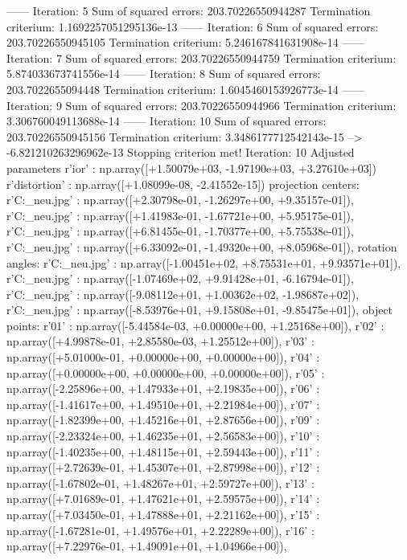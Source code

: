 ------ Iteration: 5
Sum of squared errors: 203.70226550944287
Termination criterium: 1.1692257051295136e-13
------ Iteration: 6
Sum of squared errors: 203.70226550945105
Termination criterium: 5.246167841631908e-14
------ Iteration: 7
Sum of squared errors: 203.70226550944759
Termination criterium: 5.874033673741556e-14
------ Iteration: 8
Sum of squared errors: 203.7022655094448
Termination criterium: 1.6045460153926773e-14
------ Iteration: 9
Sum of squared errors: 203.70226550944966
Termination criterium: 3.306760049113688e-14
------ Iteration: 10
Sum of squared errors: 203.70226550945156
Termination criterium: 3.3486177712542143e-15
-->
-6.821210263296962e-13
Stopping criterion met! Iteration: 10
Adjusted parameters
r'ior' : np.array([+1.50079e+03, -1.97190e+03, +3.27610e+03])
r'distortion' : np.array([+1.08099e-08, -2.41552e-15])
projection centers:
r'C:\Users\Clemens\Desktop\fotos_neu\1.jpg' : np.array([+2.30798e-01, -1.26297e+00, +9.35157e-01]),
r'C:\Users\Clemens\Desktop\fotos_neu\2.jpg' : np.array([+1.41983e-01, -1.67721e+00, +5.95175e-01]),
r'C:\Users\Clemens\Desktop\fotos_neu\3.jpg' : np.array([+6.81455e-01, -1.70377e+00, +5.75538e-01]),
r'C:\Users\Clemens\Desktop\fotos_neu\4.jpg' : np.array([+6.33092e-01, -1.49320e+00, +8.05968e-01]),
rotation angles:
r'C:\Users\Clemens\Desktop\fotos_neu\1.jpg' : np.array([-1.00451e+02, +8.75531e+01, +9.93571e+01]),
r'C:\Users\Clemens\Desktop\fotos_neu\2.jpg' : np.array([-1.07469e+02, +9.91428e+01, -6.16794e-01]),
r'C:\Users\Clemens\Desktop\fotos_neu\3.jpg' : np.array([-9.08112e+01, +1.00362e+02, -1.98687e+02]),
r'C:\Users\Clemens\Desktop\fotos_neu\4.jpg' : np.array([-8.53976e+01, +9.15808e+01, -9.85475e+01]),
object points:
r'01' : np.array([-5.44584e-03, +0.00000e+00, +1.25168e+00]),
r'02' : np.array([+4.99878e-01, +2.85580e-03, +1.25512e+00]),
r'03' : np.array([+5.01000e-01, +0.00000e+00, +0.00000e+00]),
r'04' : np.array([+0.00000e+00, +0.00000e+00, +0.00000e+00]),
r'05' : np.array([-2.25896e+00, +1.47933e+01, +2.19835e+00]),
r'06' : np.array([-1.41617e+00, +1.49510e+01, +2.21984e+00]),
r'07' : np.array([-1.82399e+00, +1.45216e+01, +2.87656e+00]),
r'09' : np.array([-2.23324e+00, +1.46235e+01, +2.56583e+00]),
r'10' : np.array([-1.40235e+00, +1.48115e+01, +2.59443e+00]),
r'11' : np.array([+2.72639e-01, +1.45307e+01, +2.87998e+00]),
r'12' : np.array([-1.67802e-01, +1.48267e+01, +2.59727e+00]),
r'13' : np.array([+7.01689e-01, +1.47621e+01, +2.59575e+00]),
r'14' : np.array([+7.03450e-01, +1.47888e+01, +2.21162e+00]),
r'15' : np.array([-1.67281e-01, +1.49576e+01, +2.22289e+00]),
r'16' : np.array([+7.22976e-01, +1.49091e+01, +1.04966e+00]),
